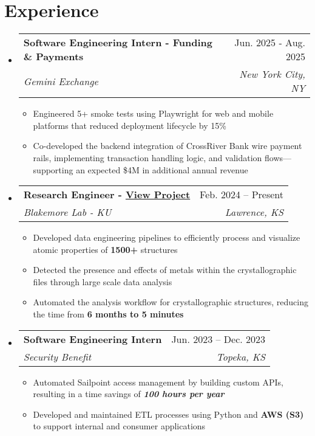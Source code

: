 \documentclass[letterpaper,10.5pt]{article}
\makeatletter
\newcommand{\resumeItem}[1]{
  \item\small{
    {#1 \vspace{-2pt}}
  }
}
\newcommand{\resumeSubheading}[4]{
  \vspace{-2pt}\item
    \begin{tabular*}{0.97\textwidth}[t]{l@{\extracolsep{\fill}}r}
      \textbf{#1} & #2 \\
      \textit{\small#3} & \textit{\small #4} \\
    \end{tabular*}\vspace{-7pt}
}
\newcommand{\resumeSubSubheading}[2]{
    \item
    \begin{tabular*}{0.97\textwidth}{l@{\extracolsep{\fill}}r}
      \textit{\small#1} & \textit{\small #2} \\
    \end{tabular*}\vspace{-7pt}
}
\newcommand{\resumeSubHeadingListStart}{\begin{itemize}[leftmargin=0.15in, label={}]}
\newcommand{\resumeSubHeadingListEnd}{\end{itemize}}
\newcommand{\resumeItemListStart}{\begin{itemize}}
\newcommand{\resumeItemListEnd}{\end{itemize}\vspace{-5pt}}
\makeatother
\begin{document}
\section{Experience}
  \resumeSubHeadingListStart  
  \resumeSubheading
      {Software Engineering Intern - Funding \& Payments}{Jun. 2025 - Aug. 2025}
      {Gemini Exchange}{New York City, NY}
      \resumeItemListStart
         \resumeItem{Engineered 5+ smoke tests using Playwright for web and mobile platforms that reduced deployment lifecycle by 15\%}
          \resumeItem{Co-developed the backend integration of CrossRiver Bank wire payment rails, implementing transaction handling logic, and validation flows—supporting an expected \$4M in additional annual revenue}
      \resumeItemListEnd
  \resumeSubheading
      {Research Engineer - \href{https://tfsi-research.vercel.app}{\underline{View Project}}}{Feb. 2024 -- Present}
      {Blakemore Lab - KU}{Lawrence, KS}
      
      \resumeItemListStart
        \resumeItem{Developed data engineering pipelines to efficiently process and visualize atomic properties of \textbf{1500+} structures}
        \resumeItem{Detected the presence and effects of metals within the crystallographic files through large scale data analysis}
        \resumeItem{Automated the analysis workflow for crystallographic structures, reducing the time from \textbf{6 months to 5 minutes}}
        
      \resumeItemListEnd

   \resumeSubheading
      {Software Engineering Intern}{Jun. 2023 -- Dec. 2023}
      {Security Benefit}{Topeka, KS}
      \resumeItemListStart
        \resumeItem{Automated Sailpoint access management by building custom APIs, resulting in a time savings of \textbf{\emph{100 hours per year}}}
         \resumeItem{Developed and maintained ETL processes using Python and \textbf{AWS (S3)} to support internal and consumer applications}
      \resumeItemListEnd
      
       
      
  \resumeSubHeadingListEnd

      
\end{document}
